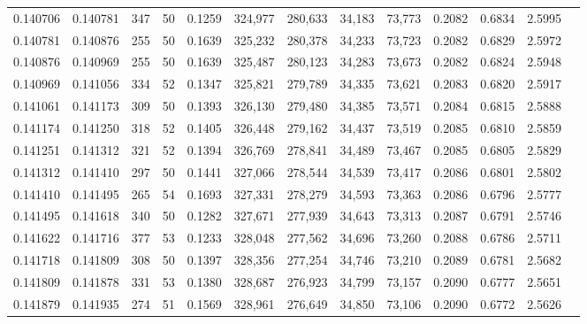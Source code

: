 \begin{tabular}{rrrrrrrrrrrrr}
0.140706 & 0.140781 &   347 &  50 &                                     0.1259 & 324,977 & 280,633 &  34,183 &  73,773 & 0.2082 & 0.6834 & 2.5995 \\
0.140781 & 0.140876 &   255 &  50 &                                     0.1639 & 325,232 & 280,378 &  34,233 &  73,723 & 0.2082 & 0.6829 & 2.5972 \\
0.140876 & 0.140969 &   255 &  50 &                                     0.1639 & 325,487 & 280,123 &  34,283 &  73,673 & 0.2082 & 0.6824 & 2.5948 \\
0.140969 & 0.141056 &   334 &  52 &                                     0.1347 & 325,821 & 279,789 &  34,335 &  73,621 & 0.2083 & 0.6820 & 2.5917 \\
0.141061 & 0.141173 &   309 &  50 &                                     0.1393 & 326,130 & 279,480 &  34,385 &  73,571 & 0.2084 & 0.6815 & 2.5888 \\
0.141174 & 0.141250 &   318 &  52 &                                     0.1405 & 326,448 & 279,162 &  34,437 &  73,519 & 0.2085 & 0.6810 & 2.5859 \\
0.141251 & 0.141312 &   321 &  52 &                                     0.1394 & 326,769 & 278,841 &  34,489 &  73,467 & 0.2085 & 0.6805 & 2.5829 \\
0.141312 & 0.141410 &   297 &  50 &                                     0.1441 & 327,066 & 278,544 &  34,539 &  73,417 & 0.2086 & 0.6801 & 2.5802 \\
0.141410 & 0.141495 &   265 &  54 &                                     0.1693 & 327,331 & 278,279 &  34,593 &  73,363 & 0.2086 & 0.6796 & 2.5777 \\
0.141495 & 0.141618 &   340 &  50 &                                     0.1282 & 327,671 & 277,939 &  34,643 &  73,313 & 0.2087 & 0.6791 & 2.5746 \\
0.141622 & 0.141716 &   377 &  53 &                                     0.1233 & 328,048 & 277,562 &  34,696 &  73,260 & 0.2088 & 0.6786 & 2.5711 \\
0.141718 & 0.141809 &   308 &  50 &                                     0.1397 & 328,356 & 277,254 &  34,746 &  73,210 & 0.2089 & 0.6781 & 2.5682 \\
0.141809 & 0.141878 &   331 &  53 &                                     0.1380 & 328,687 & 276,923 &  34,799 &  73,157 & 0.2090 & 0.6777 & 2.5651 \\
0.141879 & 0.141935 &   274 &  51 &                                     0.1569 & 328,961 & 276,649 &  34,850 &  73,106 & 0.2090 & 0.6772 & 2.5626 \\

\end{tabular}
